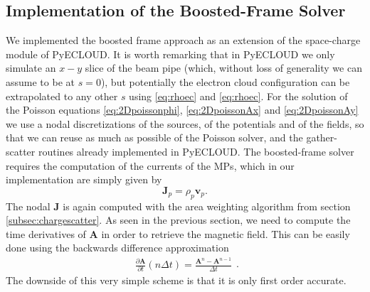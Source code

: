 \subsection{Implementation of the Boosted-Frame Solver}
We implemented the boosted frame approach as an extension of the space-charge module of PyECLOUD. 
It is worth remarking that in PyECLOUD we only simulate an $x-y$ slice of the beam pipe (which, without loss of generality we can assume to be at $s=0$), but potentially the electron cloud configuration can be extrapolated to any other $s$ using \ref{eq:rhoec} and \ref{eq:rhoec}. 
For the solution of the Poisson equations \ref{eq:2Dpoissonphi}, \ref{eq:2DpoissonAx} and \ref{eq:2DpoissonAy} we use a nodal discretizations of the sources, of the potentials and of the fields, so that we can reuse as much as possible of the Poisson solver, and the gather-scatter routines already implemented in PyECLOUD. 
The boosted-frame solver requires the computation of the currents of the MPs, which in our implementation are simply given by $$\mathbf{J}_p = \rho_p \mathbf{v}_p.$$ The nodal $\mathbf{J}$ is again computed with the area weighting algorithm from section \ref{subsec:chargescatter}.
As seen in the previous section, we need to compute the time derivatives of  $\mathbf{A}$ in order to retrieve the magnetic field. This can be easily done using the backwards difference approximation
\begin{equation*}
    \begin{split}
        \frac{\partial \mathbf{A}}{\partial t}(n\Delta t)=\frac{\mathbf{A}^n-\mathbf{A}^{n-1}}{\Delta t}
    \end{split}.
\end{equation*}
The downside of this very simple scheme is that it is only first order accurate.
